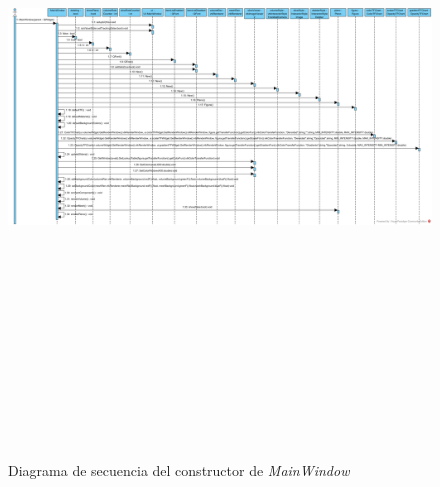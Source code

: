 \begin{figure}[H]
	\centering
	\includegraphics[angle=90,height=18cm]{imagenes/diagramas/secuencia/MainWindow_New}
	\caption{Diagrama de secuencia del constructor de \textit{MainWindow}}
	\label{fig:diagrama_secuencia_mainwindow_new}
\end{figure}

